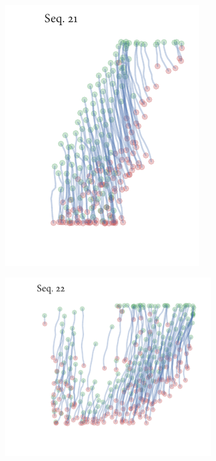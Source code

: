 \begin{figure}[h]
\begin{subfigure}[t]{0.5\textwidth}
		\includegraphics{streamline_sequence21.pdf}
	\end{subfigure}%
	\begin{subfigure}[t]{0.5\textwidth}
		\centering
		\includegraphics{streamline_sequence22.pdf}
	\end{subfigure}
	\begin{subfigure}[t]{0.5\textwidth}
		\centering

\end{subfigure}
\end{figure}
